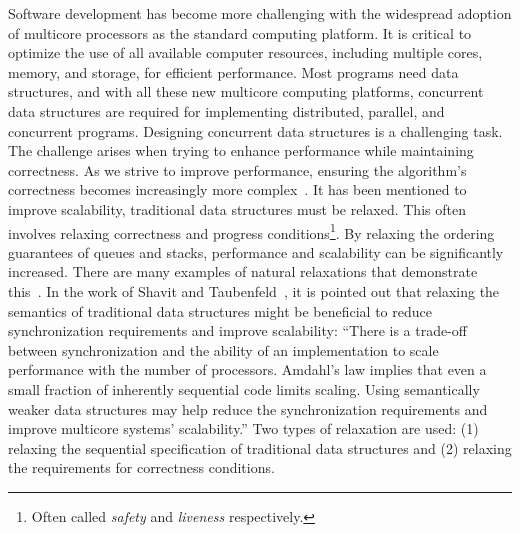 Software development has become more challenging with the widespread adoption of multicore processors as the standard computing platform. It is critical to optimize the use of all available computer resources, including multiple cores, memory, and storage, for efficient performance. Most programs need data structures, and with all these new multicore computing platforms, concurrent data structures are required for implementing distributed, parallel, and concurrent programs. Designing concurrent data structures is a challenging task. The challenge arises when trying to enhance performance while maintaining correctness. As we strive to improve performance, ensuring the algorithm's correctness becomes increasingly more complex~\cite{DBLP_journals_cacm_Shavit11}. It has been mentioned to improve scalability, traditional data structures must be relaxed. This often involves relaxing correctness and progress conditions\footnote{Often called \textit{safety} and \textit{liveness} respectively.}. By relaxing the ordering guarantees of queues and stacks, performance and scalability can be significantly increased. There are many examples of natural relaxations that demonstrate this~\cite{DBLP_journals_cacm_Shavit11}. In the work of Shavit and Taubenfeld~\cite{DBLP_journals_dc_ShavitT16}, it is pointed out that relaxing the semantics of traditional data structures might be beneficial to reduce synchronization requirements and improve scalability: ``There is a trade-off between synchronization and the ability of an implementation to scale performance with the number of processors. Amdahl’s law implies that even a small fraction of inherently sequential code limits scaling. Using semantically weaker data structures may help reduce the synchronization requirements and improve multicore systems' scalability.''
Two types of relaxation are used: (1) relaxing the sequential specification of traditional data structures and (2) relaxing the requirements for correctness conditions.

